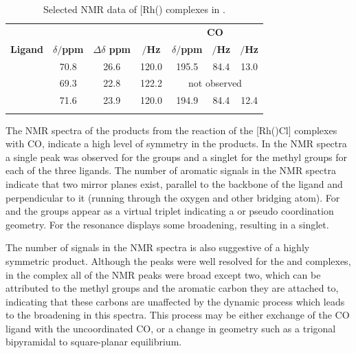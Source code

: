 
\begin{table}[htbp]
\caption[Selected NMR data of [Rh(\tBuxantphos)\ce{(CO)2Cl}{]} complexes]{Selected NMR data of [Rh(\tBuxantphos)\ce{(CO)2Cl]} complexes in .}
\vspace{1em}
\label{table:rhodiumcarbonyl}
\small
\begin{center}
\begin{tabular}{l c c c c c c}
	\toprule{}
	~ & \multicolumn{3}{c}{\bfseries{\phosphorus}} & \multicolumn{3}{c}{\bfseries{\carbon{} CO}} \\
	\cmidrule(lr){2-4} \cmidrule(lr){5-7}
	\bfseries{Ligand}&\bfseries{$\delta/$ppm}&\bfseries{$\Delta\delta$ ppm}&\bfseries{\JRhP{}$/$Hz}&\bfseries{$\delta/$ppm}&\bfseries{\JRhC $/$Hz}&\bfseries{\JPC $/$Hz}\\
	\midrule
	\tBuSixantphos	&	70.8	&	26.6 & 120.0	&	195.5	& 84.4	& 13.0\\
	\tBuThixantphos	& 	69.3	&	22.8	& 122.2	&	\multicolumn{3}{c}{not observed}\\
	\tBuXantphos	&	71.6	&	23.9	& 120.0	&	194.9	& 84.4	& 12.4\\
	\bottomrule{}
\end{tabular}
\end{center}
\end{table}


The NMR spectra of the products from the reaction of the [Rh(\tBuxantphos)Cl] complexes with CO, indicate a high level of symmetry in the products.  In the \proton{} NMR spectra a single peak was observed for the \tBu{} groups and a singlet for the methyl groups for each of the three ligands.  The number of aromatic signals in the \proton{} NMR spectra indicate that two mirror planes exist, parallel to the backbone of the ligand and perpendicular to it (running through the oxygen and other bridging atom).  For \tBusixantphos{} and \tBuxantphos{} the \tBu{} groups appear as a virtual triplet indicating a \trans{} or pseudo \trans{} coordination geometry.  For \tButhixantphos{} the \tBu{} resonance displays some broadening, resulting in a singlet.

The number of signals in the \carbon{} NMR spectra is also suggestive of a highly symmetric product. Although the peaks were well resolved for the \tBusixantphos{} and \tBuxantphos{} complexes, in the \tButhixantphos{} complex all of the \carbon{} NMR peaks were broad except two, which can be attributed to the methyl groups and the aromatic carbon they are attached to, indicating that these carbons are unaffected by the dynamic process which leads to the broadening in this spectra.  This process may be either exchange of the CO ligand with the uncoordinated CO, or a change in geometry such as a trigonal bipyramidal to square-planar equilibrium.  

